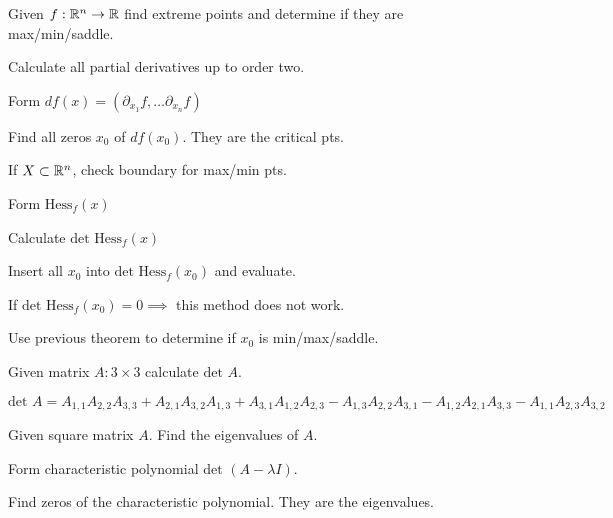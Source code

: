 Given $f: \mathbb{R}^n \to \mathbb{R}$ find extreme points and determine if they are max/min/saddle.
\begin{compactenum}
    \item Calculate all partial derivatives up to order two.
    \item Form $df(x) = (\partial_{x_1}f, \dots \partial_{x_n}f)$
    \item Find all zeros $x_0$ of $df(x_0)$. They are the critical pts.
    \item If $X \subset \mathbb{R}^n$, check boundary for max/min pts.
    \item Form $\text{Hess}_f (x)$
    \item Calculate $\text{det Hess}_f (x)$
    \item Insert all $x_0$ into $\text{det Hess}_f (x_0)$ and evaluate.
    \item If $\text{det Hess}_f (x_0) = 0 \implies$ this method does not work.
    \item Use previous theorem to determine if $x_0$ is min/max/saddle.
\end{compactenum}

Given matrix $A: 3 \times 3$ calculate $\text{det }A$.

$\text{det } A = A_{1, 1} A_{2, 2} A_{3, 3} + A_{2, 1} A_{3, 2} A_{1, 3} + A_{3, 1} A_{1, 2} A_{2, 3} - A_{1, 3} A_{2, 2} A_{3, 1} - A_{1, 2} A_{2, 1} A_{3, 3} - A_{1, 1} A_{2, 3} A_{3, 2}$

Given square matrix $A$. Find the eigenvalues of $A$.

\begin{compactenum}
    \item Form characteristic polynomial $\text{det } (A - \lambda I)$.
    \item Find zeros of the characteristic polynomial. They are the eigenvalues.
\end{compactenum}

